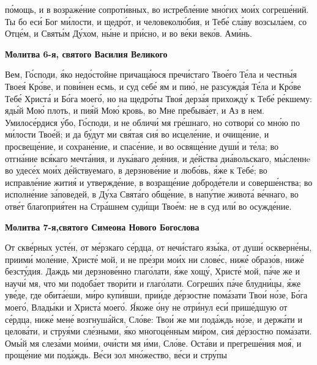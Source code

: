 по́мощь, и в возраже́ние сопроти́вных, во истребле́ние мно́гих мои́х
согреше́ний. Ты бо еси́ Бог ми́лости, и щедро́т, и человеколю́бия, и Тебе́
сла́ву возсыла́ем, со Отце́м, и Святы́м Ду́хом, ны́не и при́сно, и во ве́ки
веко́в. Ами́нь.



 

\bfseries Молитва 6-я, святого Василия Великого\normalfont{}


   Вем, Го́споди, я́ко недо́стойне причаща́юся пречи́стаго Твое́го Те́ла и
честны́я Твоея́ Кро́ве, и пови́нен есмь, и суд себе́ ям и пию́, не разсужда́я
Те́ла и Кро́ве Тебе́ Христа́ и Бо́га моего́, но на щедро́ты Твоя́ дерза́я
прихожду́ к Тебе́ ре́кшему: яды́й Мою́ плоть, и пия́й Мою́ кровь, во
Мне пребыва́ет, и Аз в нем. Умилосе́рдися у́бо, Го́споди, и не обличи́
мя гре́шнаго, но сотвори́ со мно́ю по ми́лости Твое́й; и да бу́дут ми
свя́тая сия́ во исцеле́ние, и очище́ние, и просвеще́ние, и сохране́ние, и
спасе́ние, и во освяще́ние души́ и те́ла; во отгна́ние вся́каго мечта́ния, и
лука́ваго дея́ния, и де́йства диа́вольскаго, мы́сленнe во удесе́х мои́х
де́йствуемаго, в дерзнове́ние и любо́вь, я́же к Тебе́; во исправле́ние жития́ и
утвержде́ние, в возраще́ние доброде́тели и соверше́нства; во исполне́ние
за́поведей, в Ду́ха Свята́го обще́ние, в напу́тие живота́ ве́чнаго, во
отве́т благоприя́тен на Стра́шнем суди́щи Твое́м: не в суд или́ во
осужде́ние.



 

\bfseries Молитва 7-я,святого Симеона Нового Богослова\normalfont{}


   От скве́рных усте́н, от ме́рзкаго се́рдца, от нечи́стаго язы́ка, от души́
оскверне́ны, приими́ моле́ние, Христе́ мой, и не пре́зри мои́х ни слове́с, ниже́
образо́в, ниже́ безсту́дия. Даждь ми дерзнове́нно глаго́лати, я́же хощу́,
Христе́ мой, па́че же и научи́ мя, что ми подоба́ет твори́ти и глаго́лати.
Согреши́х па́че блудни́цы, я́же уве́де, где обита́еши, ми́ро купи́вши, прии́де
де́рзостне пома́зати Твои́ но́зе, Бо́га моего́, Влады́ки и Христа́ моего́. Я́коже
о́ну не отри́нул еси́ прише́дшую от се́рдца, ниже́ мене́ возгнуша́йся,
Сло́ве: Твои́ же ми пода́ждь но́зе, и держа́ти и целова́ти, и струя́ми
сле́зными, я́ко многоце́нным ми́ром, сия́ де́рзостно пома́зати. Омы́й
мя слеза́ми мои́ми, очи́сти мя и́ми, Сло́ве. Оста́ви и прегреше́ния
моя́, и проще́ние ми пода́ждь. Ве́си зол мно́жество, ве́си и стру́пы

